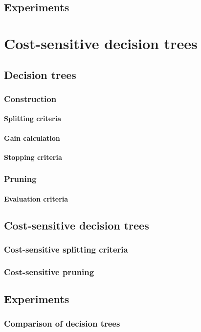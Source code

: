 \documentclass[twoside,openright,titlepage,numbers=noenddot,headinclude,%
               footinclude=true,cleardoublepage=empty,abstractoff,BCOR=5mm,%
               paper=a4,fontsize=11pt,ngerman,american,doublespace]{scrreprt}
\numberwithin{theorem}{chapter}
\numberwithin{definition}{chapter}
\numberwithin{algorithm}{chapter}
\numberwithin{figure}{chapter}
\numberwithin{table}{chapter}
\numberwithin{equation}{chapter}
\begin{document}
		\section{Experiments}

	\chapter{Cost-sensitive decision trees}
		\section{Decision trees}
			\subsection{Construction}
				\subsubsection{Splitting criteria}
				\subsubsection{Gain calculation}
				\subsubsection{Stopping criteria}
			\subsection{Pruning}
				\subsubsection{Evaluation criteria}
		\section{Cost-sensitive decision trees}
			\subsection{Cost-sensitive splitting criteria}
			\subsection{Cost-sensitive pruning}
		\section{Experiments}
			\subsection{Comparison of decision trees}
		
\end{document}
